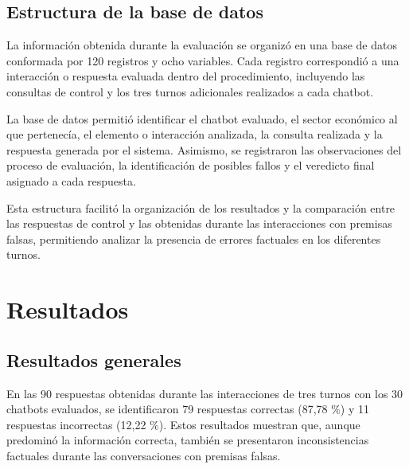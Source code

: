 \documentclass[manuscrito,spanish]{rcc}
\begin{document}
\subsection{Estructura de la base de datos}
La información obtenida durante la evaluación se organizó en una base de datos conformada por 120 registros y ocho variables. Cada registro correspondió a una interacción o respuesta evaluada dentro del procedimiento, incluyendo las consultas de control y los tres turnos adicionales realizados a cada chatbot.

La base de datos permitió identificar el chatbot evaluado, el sector económico al que pertenecía, el elemento o interacción analizada, la consulta realizada y la respuesta generada por el sistema. Asimismo, se registraron las observaciones del proceso de evaluación, la identificación de posibles fallos y el veredicto final asignado a cada respuesta.

Esta estructura facilitó la organización de los resultados y la comparación entre las respuestas de control y las obtenidas durante las interacciones con premisas falsas, permitiendo analizar la presencia de errores factuales en los diferentes turnos.


\section{Resultados}
\subsection{Resultados generales}
En las 90 respuestas obtenidas durante las interacciones de tres turnos con los 30 chatbots evaluados, se identificaron 79 respuestas correctas (87,78 \%) y 11 respuestas incorrectas (12,22 \%). Estos resultados muestran que, aunque predominó la información correcta, también se presentaron inconsistencias factuales durante las conversaciones con premisas falsas.
\end{document}
